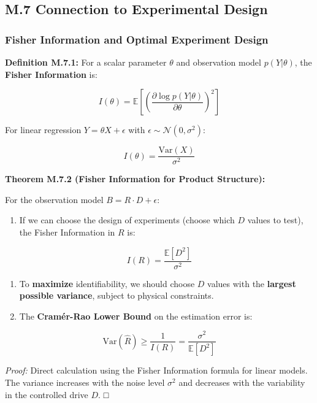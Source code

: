 \documentclass[
]{article}
\providecommand{\tightlist}{%
  \setlength{\itemsep}{0pt}\setlength{\parskip}{0pt}}
\begin{document}
\subsection{M.7 Connection to Experimental
Design}\label{m.7-connection-to-experimental-design}

\subsubsection{Fisher Information and Optimal Experiment
Design}\label{fisher-information-and-optimal-experiment-design}

\textbf{Definition M.7.1:} For a scalar parameter \(\theta\) and
observation model \(p(Y | \theta)\), the \textbf{Fisher Information} is:

\[I(\theta) = \mathbb{E}\left[\left(\frac{\partial \log p(Y | \theta)}{\partial \theta}\right)^2\right]\]

For linear regression \(Y = \theta X + \epsilon\) with
\(\epsilon \sim \mathcal{N}(0, \sigma^2)\):

\[I(\theta) = \frac{\text{Var}(X)}{\sigma^2}\]

\textbf{Theorem M.7.2 (Fisher Information for Product Structure):}

For the observation model \(B = R \cdot D + \epsilon\):

\begin{enumerate}
\def\labelenumi{\arabic{enumi}.}
\tightlist
\item
  If we can choose the design of experiments (choose which \(D\) values
  to test), the Fisher Information in \(R\) is:
\end{enumerate}

\[I(R) = \frac{\mathbb{E}[D^2]}{\sigma^2}\]

\begin{enumerate}
\def\labelenumi{\arabic{enumi}.}
\setcounter{enumi}{1}
\item
  To \textbf{maximize} identifiability, we should choose \(D\) values
  with the \textbf{largest possible variance}, subject to physical
  constraints.
\item
  The \textbf{Cramér-Rao Lower Bound} on the estimation error is:
\end{enumerate}

\[\text{Var}(\widehat{R}) \geq \frac{1}{I(R)} = \frac{\sigma^2}{\mathbb{E}[D^2]}\]

\emph{Proof:} Direct calculation using the Fisher Information formula
for linear models. The variance increases with the noise level
\(\sigma^2\) and decreases with the variability in the controlled drive
\(D\). □
\end{document}
